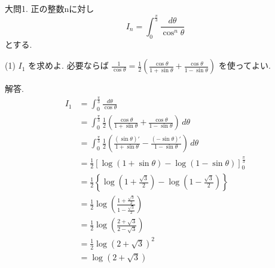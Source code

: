\documentclass{jarticle}
\begin{document}
大問1. 正の整数nに対し
\begin{equation*}
 I_n = \int^{\frac{\pi}{3}}_{0} \frac{d\theta}{\cos^n\theta}
\end{equation*}
とする. \par
(1) $I_1$ を求めよ. 必要ならば $\frac{1}{\cos\theta} = \frac{1}{2}\left(\frac{\cos\theta}{1+\sin\theta}+\frac{\cos\theta}{1-\sin\theta}\right)$ を使ってよい.  \par
解答. 
\begin{align*}
 I_1 &= \int^{\frac{\pi}{3}}_{0} \frac{d\theta}{\cos\theta} \\
     &= \int^{\frac{\pi}{3}}_{0}  \frac{1}{2}\left(\frac{\cos\theta}{1+\sin\theta}+\frac{\cos\theta}{1-\sin\theta}\right) \, d\theta \\
     &= \int^{\frac{\pi}{3}}_{0} \frac{1}{2}\left(\frac{(\sin\theta)'}{1+\sin\theta}-\frac{(-\sin\theta)'}{1-\sin\theta}\right) \, d\theta \\
     &= \frac{1}{2} \left[\log(1+\sin\theta) - \log(1-\sin\theta)\right]^{\frac{\pi}{3}}_{0} \\
     &= \frac{1}{2} \left\{ \log\left(1+\frac{\sqrt{3}}{2}\right) - \log\left(1-\frac{\sqrt{3}}{2}\right)\right\} \\
     &= \frac{1}{2} \log\left(\frac{1+\frac{\sqrt{3}}{2}}{1-\frac{\sqrt{3}}{2}}\right) \\
     &= \frac{1}{2} \log(\frac{2+\sqrt{3}}{2-\sqrt{3}}) \\
     &= \frac{1}{2} \log(2+\sqrt{3})^2 \\
     &= \log(2+\sqrt{3}) \\
\end{align*}
\end{document}
